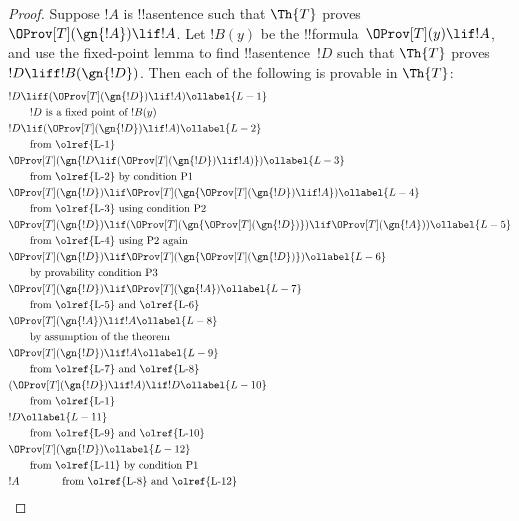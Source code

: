 \documentclass[../../../include/open-logic-section]{subfiles}
\begin{document}
\begin{proof}
Suppose $!A$ is !!a{sentence} such that $\Th{T}$ proves
$\OProv[T](\gn{!A}) \lif !A$. Let $!B(y)$ be the !!{formula}~$\OProv[T](y)
\lif !A$, and use the fixed-point lemma to find !!a{sentence}~$!D$
such that $\Th{T}$ proves $!D \liff !B(\gn{!D})$. Then each of the
following is provable in $\Th{T}$:
\begin{align}
  & !D \liff (\OProv[T](\gn{!D}) \lif !A) \ollabel{L-1}\\
  & \qquad \text{$!D$ is a fixed point of~$!B(y)$}\notag \\
  & !D \lif (\OProv[T](\gn{!D}) \lif !A) \ollabel{L-2}\\
  & \qquad\text{from \olref{L-1}}\notag\\
  & \OProv[T](\gn{!D \lif (\OProv[T](\gn{!D}) \lif !A)}) \ollabel{L-3}\\
  & \qquad \text{from \olref{L-2} by condition P1}\notag \\
  & \OProv[T](\gn{!D}) \lif \OProv[T](\gn{\OProv[T](\gn{!D}) \lif !A})
  \ollabel{L-4}\\
  &\qquad \text{from \olref{L-3} using condition P2}\notag \\
  & \OProv[T](\gn{!D}) \lif (\OProv[T](\gn{\OProv[T](\gn{!D})}) \lif \OProv[T](\gn{!A})) \ollabel{L-5}\\
  &\qquad \text{from \olref{L-4} using P2 again} \notag\\
& \OProv[T](\gn{!D}) \lif \OProv[T](\gn{\OProv[T](\gn{!D})}) \ollabel{L-6}\\
  & \qquad\text{by provability condition P3} \notag\\
  & \OProv[T](\gn{!D}) \lif \OProv[T](\gn{!A}) \ollabel{L-7} \\
  &\qquad\text{from \olref{L-5} and \olref{L-6}}\notag\\
  & \OProv[T](\gn{!A}) \lif !A \ollabel{L-8}\\
  &\qquad\text{by assumption of the theorem} \notag\\
  & \OProv[T](\gn{!D}) \lif !A \ollabel{L-9}\\
  &\qquad\text{from \olref{L-7} and \olref{L-8}}\notag\\
  & (\OProv[T](\gn{!D}) \lif !A) \lif !D \ollabel{L-10}\\
  & \qquad \text{from \olref{L-1}}\notag \\
  & !D \ollabel{L-11}\\
  & \qquad\text{from \olref{L-9} and \olref{L-10}}\notag \\
  & \OProv[T](\gn{!D}) \ollabel{L-12}\\
  & \qquad\text{from \olref{L-11} by condition~P1}\notag \\
  & !A \qquad\qquad\text{from \olref{L-8} and \olref{L-12}}\notag
\end{align}
\end{proof}
\end{document}
